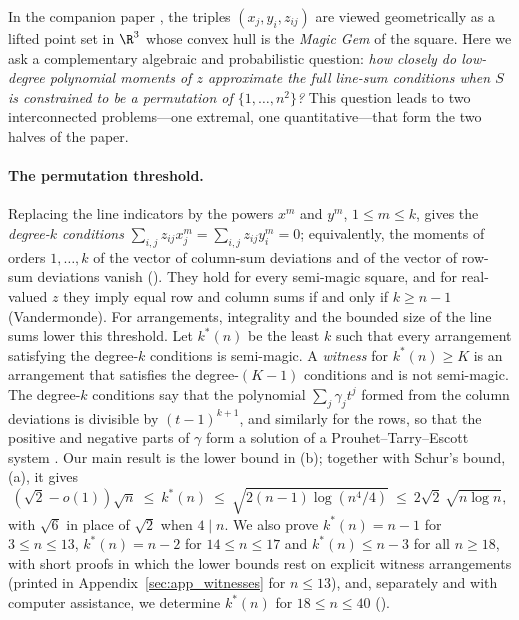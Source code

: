 In the companion paper \cite{mathewson_gems}, the triples $(x_j,y_i,z_{ij})$ are viewed geometrically as a lifted point set in $\R^3$ whose convex hull is the \emph{Magic Gem} of the square. Here we ask a complementary algebraic and probabilistic question: \emph{how closely do low-degree polynomial moments of $z$ approximate the full line-sum conditions when $S$ is constrained to be a permutation of $\{1,\dots,n^2\}$?} This question leads to two interconnected problems—one extremal, one quantitative—that form the two halves of the paper.

\paragraph{The permutation threshold.}
Replacing the line indicators by the powers $x^m$ and $y^m$, $1\le m\le k$, gives the \emph{degree-$k$ conditions} $\sum_{i,j}z_{ij}x_j^m=\sum_{i,j}z_{ij}y_i^m=0$; equivalently, the moments of orders $1,\dots,k$ of the vector of column-sum deviations and of the vector of row-sum deviations vanish ().
They hold for every semi-magic square, and for real-valued $z$ they imply equal row and column sums if and only if $k\ge n-1$ (Vandermonde).
For arrangements, integrality and the bounded size of the line sums lower this threshold.
Let $k^*(n)$ be the least $k$ such that every arrangement satisfying the degree-$k$ conditions is semi-magic.
A \emph{witness} for $k^*(n)\ge K$ is an arrangement that satisfies the degree-$(K-1)$ conditions and is not semi-magic.
The degree-$k$ conditions say that the polynomial $\sum_j\gamma_jt^j$ formed from the column deviations is divisible by $(t-1)^{k+1}$, and similarly for the rows, so that the positive and negative parts of $\gamma$ form a solution of a Prouhet--Tarry--Escott system \cite{wright1959prouhet,borwein2002computational}.
Our main result is the lower bound in (b); together with Schur's bound, (a), it gives
\[
(\sqrt2-o(1))\sqrt n\ \le\ k^*(n)\ \le\ \sqrt{2(n-1)\log(n^4/4)}\ \le\ 2\sqrt2\,\sqrt{n\log n},
\]
with $\sqrt6$ in place of $\sqrt2$ when $4\mid n$.
We also prove $k^*(n)=n-1$ for $3\le n\le13$, $k^*(n)=n-2$ for $14\le n\le17$ and $k^*(n)\le n-3$ for all $n\ge18$, with short proofs in which the lower bounds rest on explicit witness arrangements (printed in Appendix~\ref{sec:app_witnesses} for $n\le13$), and, separately and with computer assistance, we determine $k^*(n)$ for $18\le n\le40$ ().

